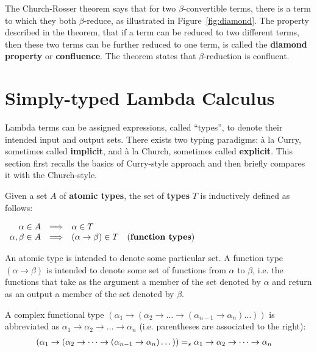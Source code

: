 The Church-Rosser theorem says that for two $\beta$-convertible terms, there is a term to which they both $\beta$-reduce, as illustrated in Figure~\ref{fig:diamond}. The property described in the theorem, that if a term can be reduced to two different terms, then these two terms can be further reduced to one term, is called the \textbf{diamond property} or \textbf{confluence}. The theorem states that $\beta$-reduction is confluent.

\section{Simply-typed Lambda Calculus}  \label{sec:A2}

Lambda terms can be assigned expressions, called ``types'', to denote their intended input and output sets. There exists two typing paradigms: 
\`{a} la Curry, sometimes called \textbf{implicit}, and \`{a} la Church, sometimes called \textbf{explicit}. This section first recalls the basics of Curry-style approach and then briefly compares it with the Church-style.

\begin{definition} Given a set $A$ of \textbf{atomic types}, the set of \textbf{types} $T$ is inductively defined as follows:
\begin{center}
$
\begin{array}{rcll}
\alpha \in A & \Longrightarrow & \alpha \in T &\\
\alpha, \beta \in A &  \Longrightarrow & (\alpha \rightarrow \beta) \in T & \text{(\textbf{function types})}
\end{array} 
$
\end{center}
\end{definition}
An atomic type is intended to denote some particular set. A function type $(\alpha \rightarrow \beta)$ is intended to denote some set of functions from $\alpha$ to $\beta$, i.e. the functions that take as the argument a member of the set denoted by $\alpha$ and return as an output a member of the set denoted by $\beta$.


\begin{remark} A complex functional type $(\alpha_1 \rightarrow (\alpha_2 \rightarrow \dots \rightarrow (\alpha_{n-1} \rightarrow \alpha_n)  \dots ))$ is abbreviated as $\alpha_1 \rightarrow \alpha_2 \rightarrow \dots \rightarrow \alpha_n$ (i.e. parentheses are associated to the right):
\begin{align*}
(\alpha_1 \rightarrow (\alpha_2 \rightarrow \dots \rightarrow (\alpha_{n-1} \rightarrow \alpha_n)  \dots )) & =_s \alpha_1 \rightarrow \alpha_2 \rightarrow \dots \rightarrow \alpha_n
\end{align*}
\end{remark}


